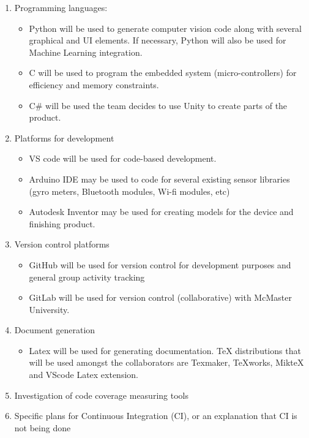 \documentclass{article}
\begin{document}
\begin{enumerate}
\item Programming languages:
\begin{itemize}
\item Python will be used to generate computer vision code along with several graphical and UI elements. If necessary, Python will also be used for Machine Learning integration.
\end{itemize}
\begin{itemize}
\item C will be used to program the embedded system (micro-controllers) for efficiency and memory constraints.
\end{itemize}
\begin{itemize}
\item C\# will be used the team decides to use Unity to create parts of the product.
\end{itemize}
\item Platforms for development 
\begin{itemize}
\item VS code will be used for code-based development.
\item Arduino IDE may be used to code for several existing sensor libraries (gyro meters, Bluetooth modules, Wi-fi modules, etc)
\item Autodesk Inventor may be used for creating models for the device and finishing product.
\end{itemize}
\item Version control platforms
\begin{itemize}
\item GitHub will be used for version control for development purposes and general group activity tracking 
\item GitLab will be used for version control (collaborative) with McMaster University.
\end{itemize}
\item Document generation
\begin{itemize}
\item Latex will be used for generating documentation. TeX distributions that will be used amongst the collaborators are  Texmaker, TeXworks, MikteX and VScode Latex extension.
\end{itemize}
\item Investigation of code coverage measuring tools
\item Specific plans for Continuous Integration (CI), or an explanation that CI
  is not being done

\end{enumerate}
\end{document}
